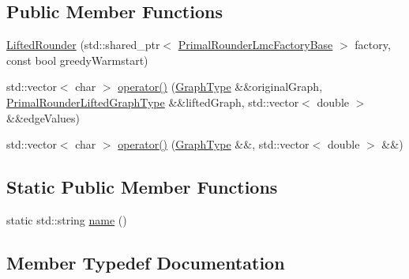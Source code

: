 \subsection*{Public Member Functions}
\begin{DoxyCompactItemize}
\item 
\hyperlink{structnifty_1_1graph_1_1opt_1_1lifted__multicut_1_1LiftedMulticutMp_1_1LiftedRounder_aab639fd39dbaace09556b329a93e844d}{Lifted\+Rounder} (std\+::shared\+\_\+ptr$<$ \hyperlink{structnifty_1_1graph_1_1opt_1_1lifted__multicut_1_1LiftedMulticutMp_1_1LiftedRounder_a0b0e44f6ebf431a6776874d27243c11d}{Primal\+Rounder\+Lmc\+Factory\+Base} $>$ factory, const bool greedy\+Warmstart)
\item 
std\+::vector$<$ char $>$ \hyperlink{structnifty_1_1graph_1_1opt_1_1lifted__multicut_1_1LiftedMulticutMp_1_1LiftedRounder_a39b672ef078607429c3a089dd83f8b9c}{operator()} (\hyperlink{structnifty_1_1graph_1_1opt_1_1lifted__multicut_1_1LiftedMulticutMp_1_1LiftedRounder_ab554fdcb105127764221d744665a12fc}{Graph\+Type} \&\&original\+Graph, \hyperlink{structnifty_1_1graph_1_1opt_1_1lifted__multicut_1_1LiftedMulticutMp_1_1LiftedRounder_a38f30577dd1d5ec834fabb297cd97f70}{Primal\+Rounder\+Lifted\+Graph\+Type} \&\&lifted\+Graph, std\+::vector$<$ double $>$ \&\&edge\+Values)
\item 
std\+::vector$<$ char $>$ \hyperlink{structnifty_1_1graph_1_1opt_1_1lifted__multicut_1_1LiftedMulticutMp_1_1LiftedRounder_a3436e1f7fc3d6b910adb43dcdf87ed20}{operator()} (\hyperlink{structnifty_1_1graph_1_1opt_1_1lifted__multicut_1_1LiftedMulticutMp_1_1LiftedRounder_ab554fdcb105127764221d744665a12fc}{Graph\+Type} \&\&, std\+::vector$<$ double $>$ \&\&)
\end{DoxyCompactItemize}
\subsection*{Static Public Member Functions}
\begin{DoxyCompactItemize}
\item 
static std\+::string \hyperlink{structnifty_1_1graph_1_1opt_1_1lifted__multicut_1_1LiftedMulticutMp_1_1LiftedRounder_a1289836f2e3664ef5a186cfefa1b5909}{name} ()
\end{DoxyCompactItemize}


\subsection{Member Typedef Documentation}
\mbox{\label{structnifty_1_1graph_1_1opt_1_1lifted__multicut_1_1LiftedMulticutMp_1_1LiftedRounder_ab554fdcb105127764221d744665a12fc}} 
